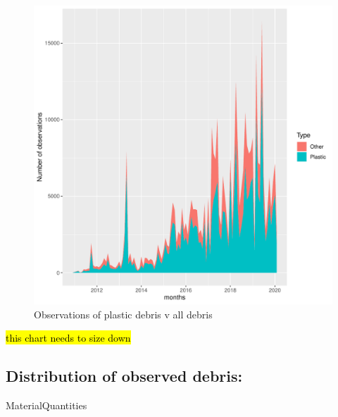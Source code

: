 \documentclass[10pt]{article}\usepackage[]{graphicx}\usepackage[]{color}
\makeatletter
\def\maxwidth{ %
  \ifdim\Gin@nat@width>\linewidth
    \linewidth
  \else
    \Gin@nat@width
  \fi
}
\newenvironment{knitrout}{}{} %
\makeatother
\begin{document}
\begin{figure}[H] %
\begin{center}
\begin{knitrout}
\color{fgcolor}
\includegraphics[width=\maxwidth]{figure/unnamed-chunk-10-1} 

\end{knitrout}
\caption {Observations of plastic debris v all debris}
\label{figF}
\end {center}
\end {figure}
\hl{this chart needs to size down}



\subsection {Distribution of observed debris:}

MaterialQuantities\\
\end{document}
